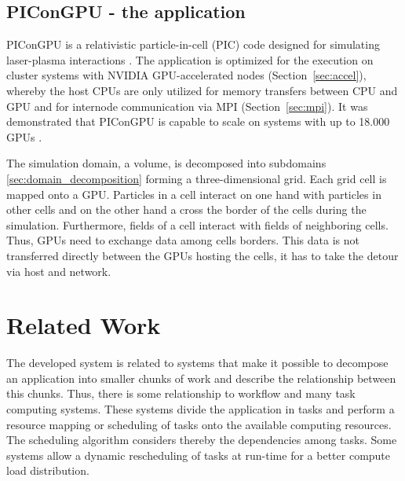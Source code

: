 \subsection{PIConGPU - the application}
\label{sec:picongpu}
PIConGPU is a relativistic particle-in-cell (PIC) code designed for
simulating laser-plasma interactions \cite{ref:picongpu}.  The
application is optimized for the execution on cluster systems with
NVIDIA GPU-accelerated nodes (Section~\ref{sec:accel}), whereby the
host CPUs are only utilized for memory transfers between CPU and GPU
and for internode communication via MPI (Section~\ref{sec:mpi}). It
was demonstrated that PIConGPU is capable to scale on systems with up
to 18.000 GPUs \cite{ref:picongpu_scale}.

The simulation domain, a volume, is decomposed into subdomains
\ref{sec:domain_decomposition} forming a three-dimensional grid. Each
grid cell is mapped onto a GPU. Particles in a cell interact on one
hand with particles in other cells and on the other hand a cross the
border of the cells during the simulation. Furthermore, fields of a
cell interact with fields of neighboring cells. Thus, GPUs need to
exchange data among cells borders. This data is not transferred
directly between the GPUs hosting the cells, it has to take the detour
via host and network.

\section{Related Work}
\label{sec:related_work}
The developed system is related to systems that make it possible to
decompose an application into smaller chunks of work and describe the
relationship between this chunks.  Thus, there is some relationship to
workflow and many task computing systems. These systems divide the
application in tasks and perform a resource mapping or scheduling of
tasks onto the available computing resources. The scheduling algorithm
considers thereby the dependencies among tasks. Some systems allow a
dynamic rescheduling of tasks at run-time for a better compute load
distribution.

